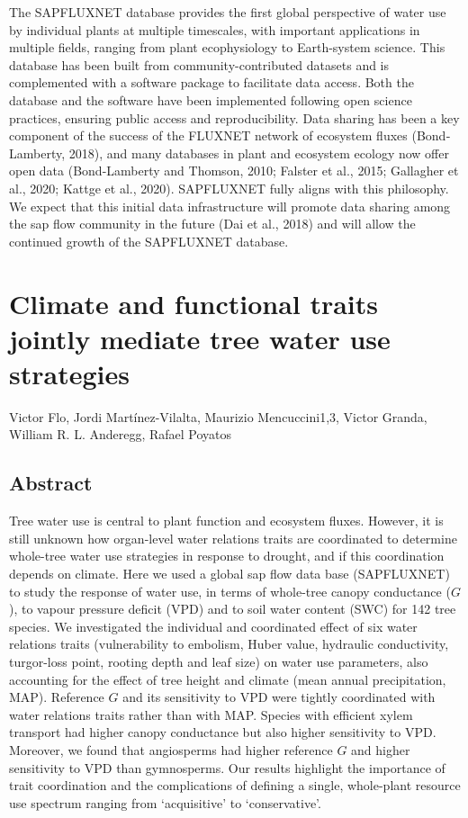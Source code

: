 \documentclass[11pt,twoside]{reedthesis}
\begin{document}
The SAPFLUXNET database provides the first global perspective of water
use by individual plants at multiple timescales, with important
applications in multiple fields, ranging from plant ecophysiology to
Earth-system science. This database has been built from
community-contributed datasets and is complemented with a software
package to facilitate data access. Both the database and the software
have been implemented following open science practices, ensuring public
access and reproducibility. Data sharing has been a key component of the
success of the FLUXNET network of ecosystem fluxes (Bond‐Lamberty,
2018), and many databases in plant and ecosystem ecology now offer open
data (Bond-Lamberty and Thomson, 2010; Falster et al., 2015; Gallagher
et al., 2020; Kattge et al., 2020). SAPFLUXNET fully aligns with this
philosophy. We expect that this initial data infrastructure will promote
data sharing among the sap flow community in the future (Dai et al.,
2018) and will allow the continued growth of the SAPFLUXNET database.

\chapter[Climate and functional traits jointly mediate tree water use strategies]{Climate and functional traits jointly mediate tree water use strategies}

\setlength{\parindent}{0pt} Victor Flo, Jordi Martínez-Vilalta, Maurizio
Mencuccini1,3, Victor Granda, William R. L. Anderegg, Rafael Poyatos

\newpage

\setlength{\parindent}{30pt}

\section*{Abstract}

Tree water use is central to plant function and ecosystem fluxes.
However, it is still unknown how organ-level water relations traits are
coordinated to determine whole-tree water use strategies in response to
drought, and if this coordination depends on climate. Here we used a
global sap flow data base (SAPFLUXNET) to study the response of water
use, in terms of whole-tree canopy conductance (\(G\)), to vapour
pressure deficit (VPD) and to soil water content (SWC) for 142 tree
species. We investigated the individual and coordinated effect of six
water relations traits (vulnerability to embolism, Huber value,
hydraulic conductivity, turgor-loss point, rooting depth and leaf size)
on water use parameters, also accounting for the effect of tree height
and climate (mean annual precipitation, MAP). Reference \(G\) and its
sensitivity to VPD were tightly coordinated with water relations traits
rather than with MAP. Species with efficient xylem transport had higher
canopy conductance but also higher sensitivity to VPD. Moreover, we
found that angiosperms had higher reference \(G\) and higher sensitivity
to VPD than gymnosperms. Our results highlight the importance of trait
coordination and the complications of defining a single, whole-plant
resource use spectrum ranging from `acquisitive' to `conservative'.\par
\newpage
\end{document}
